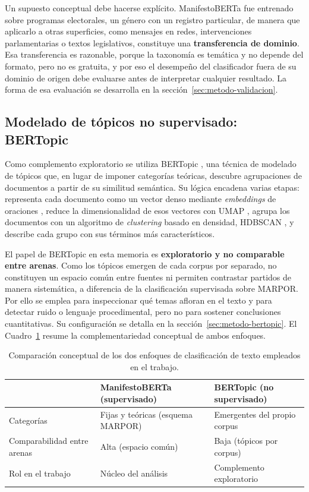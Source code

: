 Un supuesto conceptual debe hacerse explícito. ManifestoBERTa fue entrenado sobre
programas electorales, un género con un registro particular, de manera que
aplicarlo a otras superficies, como mensajes en redes, intervenciones
parlamentarias o textos legislativos, constituye una \textbf{transferencia de
dominio}. Esa transferencia es razonable, porque la taxonomía es temática y no
depende del formato, pero no es gratuita, y por eso el desempeño del clasificador
fuera de su dominio de origen debe evaluarse antes de interpretar cualquier
resultado. La forma de esa evaluación se desarrolla en la
sección~\ref{sec:metodo-validacion}.

\subsection{Modelado de tópicos no supervisado: BERTopic}
\label{sec:bertopic}

Como complemento exploratorio se utiliza BERTopic \cite{grootendorst2022bertopic},
una técnica de modelado de tópicos que, en lugar de imponer categorías teóricas,
descubre agrupaciones de documentos a partir de su similitud semántica. Su lógica
encadena varias etapas: representa cada documento como un vector denso mediante
\emph{embeddings} de oraciones \cite{reimers2019sentencebert}, reduce la
dimensionalidad de esos vectores con UMAP \cite{mcinnes2018umap}, agrupa los
documentos con un algoritmo de \emph{clustering} basado en densidad, HDBSCAN
\cite{mcinnes2017hdbscan}, y describe cada grupo con sus términos más
característicos.

El papel de BERTopic en esta memoria es \textbf{exploratorio y no comparable entre
arenas}. Como los tópicos emergen de cada corpus por separado, no constituyen un
espacio común entre fuentes ni permiten contrastar partidos de manera sistemática,
a diferencia de la clasificación supervisada sobre MARPOR. Por ello se emplea para
inspeccionar qué temas afloran en el texto y para detectar ruido o lenguaje
procedimental, pero no para sostener conclusiones cuantitativas. Su configuración
se detalla en la sección~\ref{sec:metodo-bertopic}. El
Cuadro~\ref{tab:nlp-comparacion} resume la complementariedad conceptual de ambos
enfoques.

\begin{table}[H]
\centering
\caption{Comparación conceptual de los dos enfoques de clasificación de texto
empleados en el trabajo.}
\label{tab:nlp-comparacion}
\small
\begin{tabularx}{\textwidth}{@{}l >{\raggedright\arraybackslash}X >{\raggedright\arraybackslash}X@{}}
\toprule
 & \textbf{ManifestoBERTa (supervisado)} & \textbf{BERTopic (no supervisado)} \\
\midrule
Categorías & Fijas y teóricas (esquema MARPOR) & Emergentes del propio corpus \\
Comparabilidad entre arenas & Alta (espacio común) & Baja (tópicos por corpus) \\
Rol en el trabajo & Núcleo del análisis & Complemento exploratorio \\
\bottomrule
\end{tabularx}
\end{table}

